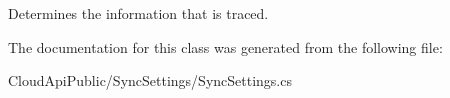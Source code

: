Determines the information that is traced. 



The documentation for this class was generated from the following file\-:\begin{DoxyCompactItemize}
\item 
Cloud\-Api\-Public/\-Sync\-Settings/Sync\-Settings.\-cs\end{DoxyCompactItemize}
